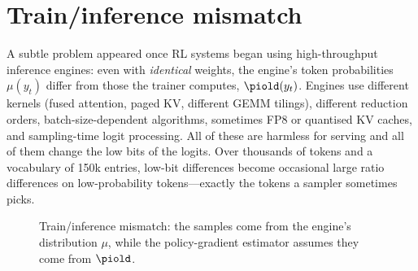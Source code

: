 \section{Train/inference mismatch}\label{sec:rlsys:mismatch}

A subtle problem appeared once RL systems began using high-throughput inference engines: even
with \emph{identical} weights, the engine's token probabilities $\mu(y_t)$ differ from those the
trainer computes, $\piold(y_t)$. Engines use different kernels (fused attention, paged KV,
different GEMM tilings), different reduction orders, batch-size-dependent algorithms,
sometimes FP8 or quantised KV caches, and sampling-time logit processing. All of these are
harmless for serving and all of them change the low bits of the logits. Over thousands of
tokens and a vocabulary of 150k entries, low-bit differences become occasional large ratio
differences on low-probability tokens---exactly the tokens a sampler sometimes picks.

\begin{figure}[t]
\centering
{}
\caption{Train/inference mismatch: the samples come from the engine's distribution $\mu$,
while the policy-gradient estimator assumes they come from $\piold$.}
\label{fig:rlsys:mismatch}
\end{figure}

